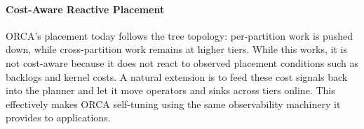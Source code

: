 \paragraph{Cost-Aware Reactive Placement}
ORCA’s placement today follows the tree topology: per-partition work is pushed down, while
cross-partition work remains at higher tiers.
While this works, it is not cost-aware because it does not react to observed placement conditions
such as backlogs and kernel costs.
A natural extension is to feed these cost signals back into the planner and let it move operators
and sinks across tiers online.
This effectively makes ORCA self-tuning using the same observability machinery it provides to
applications.









